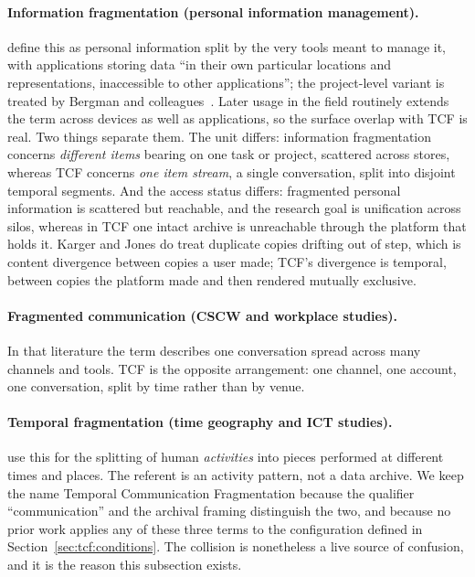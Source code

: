 \paragraph{Information fragmentation (personal information management).}
\citet{karger2006unification} define this as personal information split by the
very tools meant to manage it, with applications storing data ``in their own
particular locations and representations, inaccessible to other applications'';
the project-level variant is treated by Bergman and
colleagues~\citep{bergman2006project}. Later usage in the field routinely extends
the term across devices as well as applications, so the surface overlap with TCF
is real. Two things separate them. The unit differs: information fragmentation
concerns \emph{different items} bearing on one task or project, scattered across
stores, whereas TCF concerns \emph{one item stream}, a single conversation, split
into disjoint temporal segments. And the access status differs: fragmented
personal information is scattered but reachable, and the research goal is
unification across silos, whereas in TCF one intact archive is unreachable
through the platform that holds it. Karger and Jones do treat duplicate copies
drifting out of step, which is content divergence between copies a user made;
TCF's divergence is temporal, between copies the platform made and then rendered
mutually exclusive.

\paragraph{Fragmented communication (CSCW and workplace studies).}
In that literature the term describes one conversation spread across many
channels and tools. TCF is the opposite arrangement: one channel, one account,
one conversation, split by time rather than by venue.

\paragraph{Temporal fragmentation (time geography and ICT studies).}
\citet{hubers2008temporal} use this for the splitting of human \emph{activities}
into pieces performed at different times and places. The referent is an activity
pattern, not a data archive. We keep the name Temporal Communication
Fragmentation because the qualifier ``communication'' and the archival framing
distinguish the two, and because no prior work applies any of these three terms
to the configuration defined in Section~\ref{sec:tcf:conditions}. The collision
is nonetheless a live source of confusion, and it is the reason this subsection
exists.
